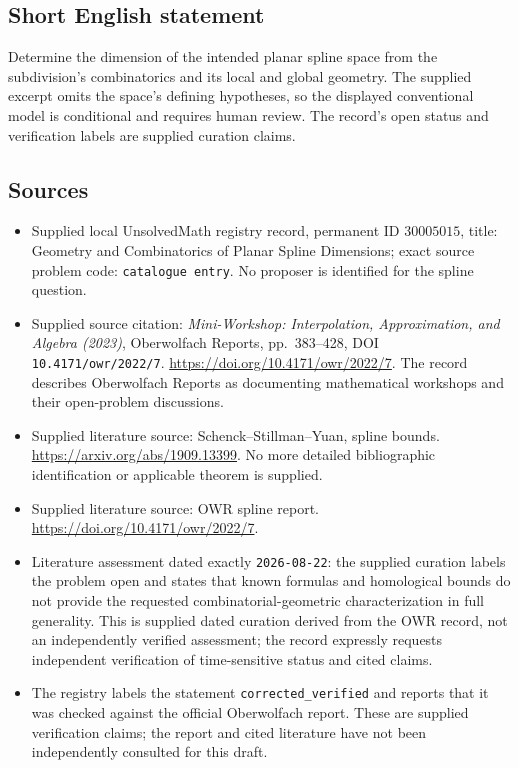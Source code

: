 \documentclass[11pt]{article}
\begin{document}
\subsection{Short English statement}
Determine the dimension of the intended planar spline space from the subdivision's combinatorics and its local and global geometry. The supplied excerpt omits the space's defining hypotheses, so the displayed conventional model is conditional and requires human review. The record's open status and verification labels are supplied curation claims.
\subsection{Sources}
\begin{itemize}
\item Supplied local UnsolvedMath registry record, permanent ID \(30005015\), title: Geometry and Combinatorics of Planar Spline Dimensions; exact source problem code: \texttt{catalogue entry}. No proposer is identified for the spline question.
\item Supplied source citation: \emph{Mini-Workshop: Interpolation, Approximation, and Algebra (2023)}, Oberwolfach Reports, pp.~383--428, DOI \texttt{10.4171/owr/2022/7}. \url{https://doi.org/10.4171/owr/2022/7}. The record describes Oberwolfach Reports as documenting mathematical workshops and their open-problem discussions.
\item Supplied literature source: Schenck--Stillman--Yuan, spline bounds. \url{https://arxiv.org/abs/1909.13399}. No more detailed bibliographic identification or applicable theorem is supplied.
\item Supplied literature source: OWR spline report. \url{https://doi.org/10.4171/owr/2022/7}.
\item Literature assessment dated exactly \texttt{2026-08-22}: the supplied curation labels the problem open and states that known formulas and homological bounds do not provide the requested combinatorial-geometric characterization in full generality. This is supplied dated curation derived from the OWR record, not an independently verified assessment; the record expressly requests independent verification of time-sensitive status and cited claims.
\item The registry labels the statement \texttt{corrected\_verified} and reports that it was checked against the official Oberwolfach report. These are supplied verification claims; the report and cited literature have not been independently consulted for this draft.
\end{itemize}
\end{document}
